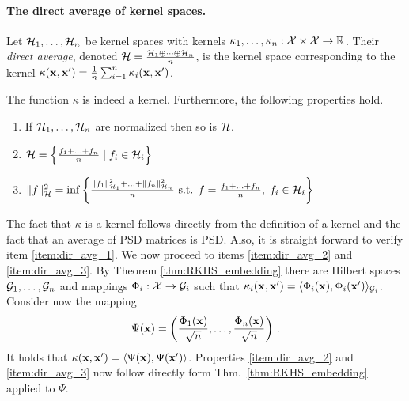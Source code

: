 \paragraph{The direct average of kernel spaces.} Let ${\cal H}_1,\ldots,{\cal H}_n$ be
kernel spaces with kernels
$\kappa_1,\ldots,\kappa_n:{\cal X}\times{\cal X}\to\mathbb{R}$. Their {\em direct
average}, denoted ${\cal H}=\frac{{\cal H}_1\oplus\cdots\oplus{\cal H}_n}{n}$, is the
kernel space corresponding to the kernel
$\kappa({\mathbf x},{\mathbf x}')=\frac{1}{n}\sum_{i=1}^n\kappa_i({\mathbf x},{\mathbf x}')$.
\begin{lemma}\label{lem:direct_avg}
The function $\kappa$ is indeed a kernel. Furthermore, the following
properties hold.
\begin{enumerate}
\item \label{item:dir_avg_1}
  If ${\cal H}_1,\ldots,{\cal H}_n$ are normalized then so is ${\cal H}$.
\item \label{item:dir_avg_2}
  ${\cal H} = \left\{\frac{f_1+\ldots+f_n}{n}\mid f_i\in{\cal H}_{i}\right\}$
\item \label{item:dir_avg_3}
    $\|f\|^2_{{\cal H}} = \inf
     \left\{ \frac{\|f_1\|^2_{{\cal H}_1}+\ldots+\|f_n\|^2_{{\cal H}_n}}{n}
     \mbox{ s.t. } f=\frac{f_1+\ldots+f_n}{n},\;f_i\in{\cal H}_i\right\}$
\end{enumerate}
\end{lemma}
The fact that $\kappa$ is a kernel follows directly from the definition of a
kernel and the fact that an average of PSD matrices is PSD. Also, it is
straight forward to verify item \ref{item:dir_avg_1}. We now proceed to
items \ref{item:dir_avg_2} and \ref{item:dir_avg_3}. By Theorem
\ref{thm:RKHS_embedding} there are Hilbert spaces ${\cal G}_1,\ldots,{\cal G}_n$ and
mappings $\Phi_i:{\cal X}\to{\cal G}_i$ such that $\kappa_i({\mathbf x},{\mathbf x}')=\langle \Phi_i({\mathbf x}),
\Phi_i({\mathbf x}') \rangle_{{\cal G}_i}$. Consider now the mapping
\[
\Psi({\mathbf x}) = 
  \left(\frac{\Phi_1({\mathbf x})}{\sqrt{n}},\ldots,\frac{\Phi_n({\mathbf x})}{\sqrt{n}}\right)
  \,.
\]
It holds that $\kappa({\mathbf x},{\mathbf x}')=\langle \Psi({\mathbf x}),\Psi({\mathbf x}') \rangle$. Properties
\ref{item:dir_avg_2} and \ref{item:dir_avg_3} now follow directly form
Thm.~\ref{thm:RKHS_embedding} applied to $\Psi$.  \proofbox

